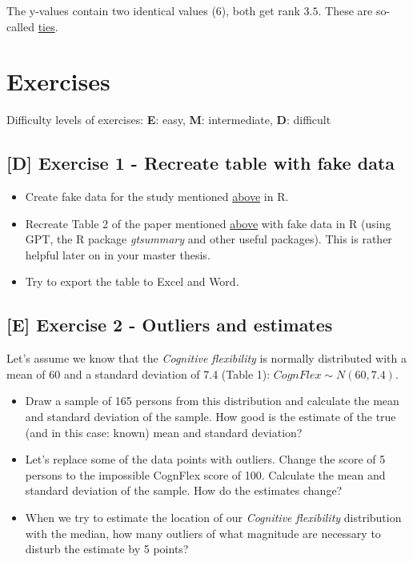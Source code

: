 \documentclass[
]{book}
\providecommand{\tightlist}{%
  \setlength{\itemsep}{0pt}\setlength{\parskip}{0pt}}
\begin{document}
The y-values contain two identical values (\(6\)), both get rank \(3.5\).
These are so-called \href{https://stats.stackexchange.com/questions/7941/what-is-tied-data-in-the-context-of-a-rank-correlation-coefficient}{ties}.

\section{Exercises}\label{exercises-2}

Difficulty levels of exercises:
\textbf{E}: easy,
\textbf{M}: intermediate,
\textbf{D}: difficult

\subsection{{[}D{]} Exercise 1 - Recreate table with fake data}\label{d-exercise-1---recreate-table-with-fake-data}

\begin{itemize}
\tightlist
\item
  Create fake data for the study mentioned \hyperref[example_study1_physio]{above} in R.
\item
  Recreate Table 2 of the paper mentioned \hyperref[example_study1_physio]{above} with fake data in R (using GPT, the R package \emph{gtsummary} and other useful packages).
  This is rather helpful later on in your master thesis.
\item
  Try to export the table to Excel and Word.
\end{itemize}

\subsection{{[}E{]} Exercise 2 - Outliers and estimates}\label{e-exercise-2---outliers-and-estimates}

Let's assume we know that the \emph{Cognitive flexibility} is normally distributed with a mean of 60 and a standard deviation of 7.4 (Table 1): \(CognFlex \sim N(60,7.4)\).

\begin{itemize}
\tightlist
\item
  Draw a sample of 165 persons from this distribution and calculate the mean and standard deviation of the sample.
  How good is the estimate of the true (and in this case: known) mean and standard deviation?
\item
  Let's replace some of the data points with outliers. Change the score of 5 persons to the impossible CognFlex score of 100.
  Calculate the mean and standard deviation of the sample. How do the estimates change?
\item
  When we try to estimate the location of our \emph{Cognitive flexibility} distribution with the median,
  how many outliers of what magnitude are necessary to disturb the estimate by 5 points?
\end{itemize}
\end{document}
